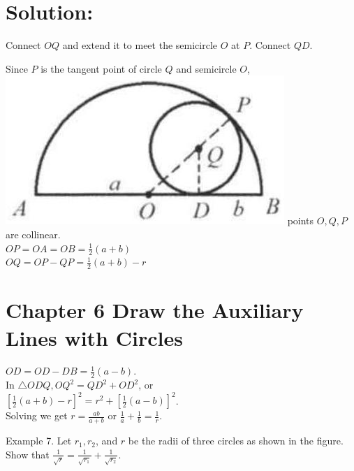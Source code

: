 \documentclass[10pt]{article}
\begin{document}
\section*{Solution:}
Connect \(O Q\) and extend it to meet the semicircle \(O\) at \(P\). Connect \(Q D\).

Since \(P\) is the tangent point of circle \(Q\) and semicircle \(O\),\\
\includegraphics[max width=\textwidth]{2025_04_17_97bc1f7e44d93c271a88g-178(2)} points \(O, Q, P\) are collinear.\\
\(O P=O A=O B=\frac{1}{2}(a+b)\)\\
\(O Q=O P-Q P=\frac{1}{2}(a+b)-r\)

\section*{Chapter 6 Draw the Auxiliary Lines with Circles}
\(O D=O D-D B=\frac{1}{2}(a-b)\).\\
In \(\triangle O D Q, O Q^{2}=Q D^{2}+O D^{2}\), or\\
\(\left[\frac{1}{2}(a+b)-r\right]^{2}=r^{2}+\left[\frac{1}{2}(a-b)\right]^{2}\).\\
Solving we get \(r=\frac{a b}{a+b}\) or \(\frac{1}{a}+\frac{1}{b}=\frac{1}{r}\).

Example 7. Let \(r_{1}, r_{2}\), and \(r\) be the radii of three circles as shown in the figure.\\
Show that \(\frac{1}{\sqrt{r}}=\frac{1}{\sqrt{r_{1}}}+\frac{1}{\sqrt{r_{2}}}\).
\end{document}
